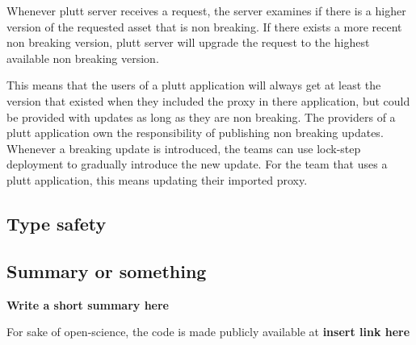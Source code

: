 Whenever plutt server receives a request, the server examines if there is a higher version of the requested asset that is non breaking. If there exists a more recent non breaking version, plutt server will upgrade the request to the highest available non breaking version.

This means that the users of a plutt application will always get at least the version that existed when they included the proxy in there application, but could be provided with updates as long as they are non breaking. The providers of a plutt application own the responsibility of publishing non breaking updates. Whenever a breaking update is introduced, the teams can use lock-step deployment to gradually introduce the new update. For the team that uses a plutt application, this means updating their imported proxy.

\subsection{Type safety}



\subsection{Summary or something}

\textbf{Write a short summary here}

For sake of open-science, the code is made publicly available at \textbf{insert link here}